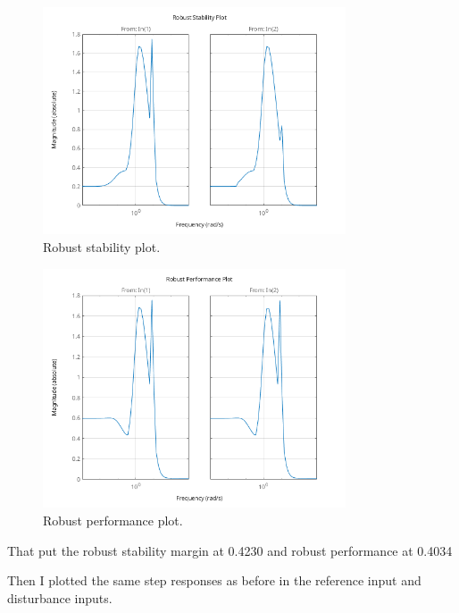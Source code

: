 \documentclass{article}
\begin{document}
\begin{figure}[H]
    \centering
    \includegraphics[width=0.8\textwidth]{robustStabilityPlotOmPointOhOne.png}
    \caption{Robust stability plot.}
    \label{fig:robustStabilityPlotOmPointOhOne}
\end{figure}

\begin{figure}[H]
    \centering
    \includegraphics[width=0.8\textwidth]{robustPerformancePlotOmPointOhOne.png}
    \caption{Robust performance plot.}
    \label{fig:robustPerformancePlotOmPointOhOne}
\end{figure}

That put the robust stability margin at 0.4230 and robust performance at 0.4034

Then I plotted the same step responses as before in the reference input and disturbance inputs.
\end{document}
